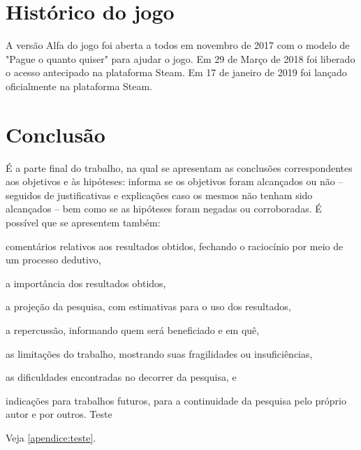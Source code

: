 \documentclass[12pt,oneside,a4paper,chapter=TITLE,section=TITLE,sumario
=tradicional]{abntex2}
\begin{document}
\chapter{Histórico do jogo}
\label{cap:historico-do-jogo}

A versão Alfa do jogo foi aberta a todos em novembro de 2017 com o modelo de "Pague o quanto quiser" para ajudar o jogo.
Em 29 de Março de 2018 foi liberado o acesso antecipado na plataforma Steam.
Em 17 de janeiro de 2019 foi lançado oficialmente na plataforma Steam.

\chapter{Conclusão}

É a parte final do trabalho, na qual se apresentam as conclusões 
correspondentes aos objetivos e às hipóteses: informa se os objetivos foram 
alcançados ou não – seguidos de justificativas e explicações caso os mesmos não 
tenham sido alcançados – bem como se as hipóteses foram negadas ou 
corroboradas. É possível que se apresentem também:

\begin{lista}
    \item comentários relativos aos resultados obtidos, fechando o raciocínio 
    por meio de um processo dedutivo,
    
    \item a importância dos resultados obtidos,
    
    \item a projeção da pesquisa, com estimativas para o uso dos resultados,
    
    \item a repercussão, informando quem será beneficiado e em quê,
    
    \item as limitações do trabalho, mostrando suas fragilidades ou
insuficiências,
    \item as dificuldades encontradas no decorrer da pesquisa, e
    \item indicações para trabalhos futuros, para a continuidade da
pesquisa pelo próprio autor e por outros. Teste
\end{lista}

Veja \autoref{apendice:teste}.



\end{document}
